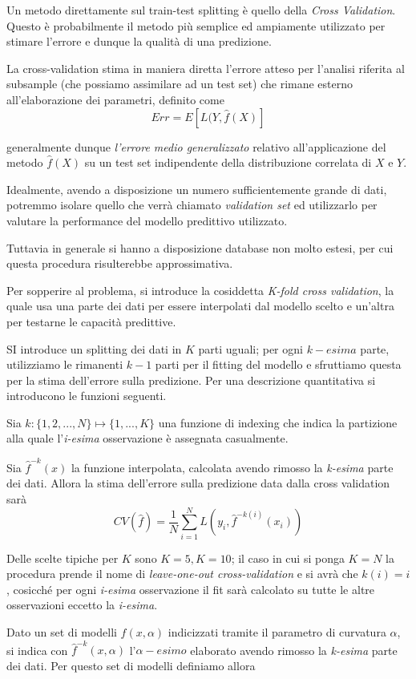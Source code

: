 \documentclass[a4paper]{report}
\begin{document}
Un metodo direttamente sul train-test splitting è quello della \textit{Cross Validation}.
Questo è probabilmente il metodo più semplice ed ampiamente utilizzato per stimare l'errore e dunque la qualità di una predizione.

La cross-validation stima in maniera diretta l'errore atteso per l'analisi riferita al subsample (che possiamo assimilare ad un test set) che rimane esterno all'elaborazione dei parametri, definito come
\[
Err=E[L(Y,\hat{f}(X)]
\]

generalmente dunque \textit{l'errore medio generalizzato} relativo all'applicazione del metodo $\hat{f}(X)$ su un test set indipendente della distribuzione correlata di $X$ e $Y$.

Idealmente, avendo a disposizione un numero sufficientemente grande di dati, potremmo isolare quello che verrà chiamato \textit{validation set} ed utilizzarlo per valutare la performance del modello predittivo utilizzato.

Tuttavia in generale si hanno a disposizione database non molto estesi, per cui questa procedura risulterebbe approssimativa.

Per sopperire al problema, si introduce la cosiddetta \textit{K-fold cross validation}, la quale usa una parte dei dati per essere interpolati dal modello scelto e un'altra per testarne le capacità predittive.

SI introduce un splitting dei dati in $K$ parti uguali; per ogni $k-esima$ parte, utilizziamo le rimanenti $k-1$ parti per il fitting del modello e sfruttiamo questa per la stima dell'errore sulla predizione.
Per una descrizione quantitativa si introducono le funzioni seguenti.

Sia $k:\{1,2,...,N\}\longmapsto\{1,...,K\}$ una funzione di indexing che indica la partizione alla quale l'\textit{i-esima} osservazione è assegnata casualmente.

Sia $\hat{f}^{-k}(x)$ la funzione interpolata, calcolata avendo rimosso la \textit{k-esima} parte dei dati.
Allora la stima dell'errore sulla predizione data dalla cross validation sarà
\[
CV(\hat{f})=\frac{1}{N}\sum^{N}_{i=1}L(y_i,\hat{f}^{-k(i)}(x_i))
\]

Delle scelte tipiche per $K$ sono $K=5,K=10$; il caso in cui si ponga $K=N$ la procedura prende il nome di \textit{leave-one-out cross-validation} e si avrà che $k(i)=i$, cosicché per ogni \textit{i-esima} osservazione il fit sarà calcolato su tutte le altre osservazioni eccetto la \textit{i-esima}.

Dato un set di modelli $f(x,\alpha)$ indicizzati tramite il parametro di curvatura $\alpha$, si indica con $\hat{f}^{-k}(x,\alpha)$ l'$\alpha-esimo$ elaborato avendo rimosso la \textit{k-esima} parte dei dati.
Per questo set di modelli definiamo allora
\end{document}
